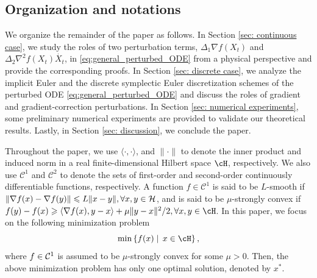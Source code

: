 \documentclass[11pt]{article}
\newcommand{\1}{\mathbf 1}
\numberwithin{equation}{section}
\begin{document}
\subsection*{Organization and notations}
We organize the remainder of the paper as follows. In Section \ref{sec: continuous case}, we study the roles of two perturbation terms, $\Delta_1 \nabla f(X_t)$ and $\Delta_2 \nabla^2 f(X_t)\dot{X_t}$, in \eqref{eq:general_perturbed_ODE} from a physical perspective and provide the corresponding proofs. In Section \ref{sec: discrete case}, we analyze the implicit Euler and the discrete symplectic Euler discretization schemes of the perturbed ODE \eqref{eq:general_perturbed_ODE} and discuss the roles of gradient and gradient-correction perturbations.
In Section \ref{sec: numerical experiments}, some preliminary numerical experiments are provided to validate our theoretical results. Lastly, in Section \ref{sec: discussion}, we conclude the paper.


Throughout the paper, we use $\langle \cdot, \cdot \rangle$, and $\|\cdot\|$ to denote the inner product and induced norm in a real finite-dimensional Hilbert space $\cH$, respectively.
We also use $\mathcal{C}^1$ and $\mathcal{C}^2$ to denote the sets of first-order and second-order continuously differentiable functions, respectively.
A function $f\in \mathcal{C}^1$ is said to be $L$-smooth if  $\|\nabla f(x)-\nabla f(y)\|\leqslant L\|x-y\|, \forall x,y \in {\cal H}$, and is said to be $\mu$-strongly convex if  $f(y)-f(x)\geqslant \langle \nabla f(x), y-x \rangle + \mu \|y-x\|^2/2, \forall x,y \in \cH$. 
In this paper, we focus on the following minimization problem 
\begin{equation}\label{basic-min}
	\min \left\{  f(x) \mid \, x\in\cH \right\}, 
\end{equation}
where  $f\in {\cal C}^1$ is assumed to be $\mu$-strongly convex for some $\mu > 0$. Then, the above minimization problem has only one optimal solution, denoted by $x^*$. 

\end{document}
